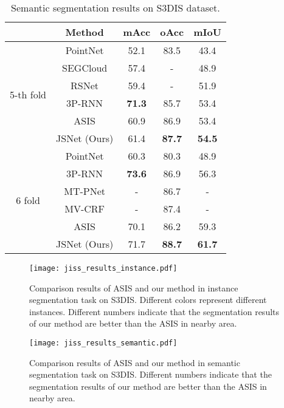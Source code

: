 \documentclass[letterpaper]{article} \usepackage{aaai20}  \usepackage{times}  \usepackage{helvet} \usepackage{courier}  \usepackage[hyphens]{url}  \usepackage{graphicx} \urlstyle{rm} \def\UrlFont{\rm}  \usepackage{graphicx}  \frenchspacing  \setlength{\pdfpagewidth}{8.5in}  \setlength{\pdfpageheight}{11in}
\begin{document}
\begin{table}[t]
	\caption{Semantic segmentation results on S3DIS dataset.}
	\smallskip
	\centering
	\resizebox{.85\columnwidth}{!}
	{
		\smallskip
		\begin{tabular}{c|c|c|c|c}
			\hline
			~ & Method         & mAcc          & oAcc          & mIoU  \\
			\hline
			\multirow{6}{*}{5-th fold}
			  & PointNet       & 52.1          & 83.5          & 43.4  \\
			~ & SEGCloud       & 57.4          & -             & 48.9  \\
			~ & RSNet          & 59.4          & -             & 51.9  \\
			~ & 3P-RNN         & \textbf{71.3} & 85.7          & 53.4  \\
			~ & ASIS           & 60.9          & 86.9          & 53.4  \\
			~ & JSNet   (Ours) & 61.4          & \textbf{87.7} & \textbf{54.5} \\
			\hline\hline
			\multirow{6}{*}{6 fold}
		      & PointNet       & 60.3          & 80.3          & 48.9  \\
			~ & 3P-RNN         & \textbf{73.6} & 86.9          & 56.3  \\
			~ & MT-PNet	       & -             & 86.7          & -     \\
			~ & MV-CRF 	       & -             & 87.4          & -     \\
			~ & ASIS 	       & 70.1          & 86.2          & 59.3  \\
			~ & JSNet   (Ours) & 71.7          & \textbf{88.7} & \textbf{61.7} \\
			\hline
		\end{tabular}
	}
	\label{tab:s3dis_sem}
\end{table}

\begin{figure}[t]
	\centering
	\texttt{[image: jiss\_results\_instance.pdf]} 
	\caption{Comparison results of ASIS and our method in instance segmentation task on S3DIS. Different colors represent different instances. Different numbers indicate that the segmentation results of our method are better than the ASIS in nearby area. }
	\label{fig:reulst_instance}
\end{figure}

\begin{figure}[t!]
	\centering
	\texttt{[image: jiss\_results\_semantic.pdf]}
	\caption{Comparison results of ASIS and our method in semantic segmentation task on S3DIS. Different numbers indicate that the segmentation results of our method are better than the ASIS in nearby area.}
	\label{fig:reulst_semantic}
\end{figure}
\end{document}
